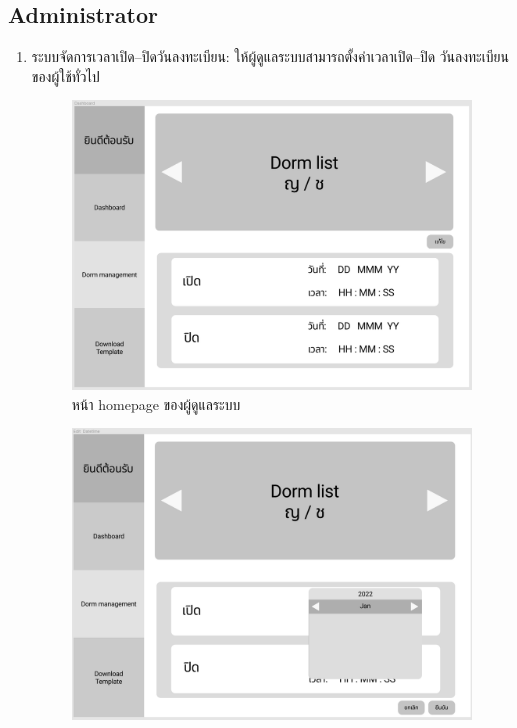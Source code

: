 \subsection{Administrator}
\begin{enumerate}
  \item ระบบจัดการเวลาเปิด--ปิดวันลงทะเบียน: ให้ผู้ดูแลระบบสามารถตั้งค่าเวลาเปิด--ปิด
  วันลงทะเบียนของผู้ใช้ทั่วไป
  \begin{figure}[h]
  \begin{center}
  \includegraphics[width=\linewidth]{photo/adminDashboard.png}
  \end{center}
  \caption{หน้า homepage ของผู้ดูแลระบบ}
  \label{fig:dashboard}
  \end{figure}
  \begin{figure}[h]
  \begin{center}
  \includegraphics[width=\linewidth]{photo/datepicker.png}

\end{center}
\end{figure}
\end{enumerate}

